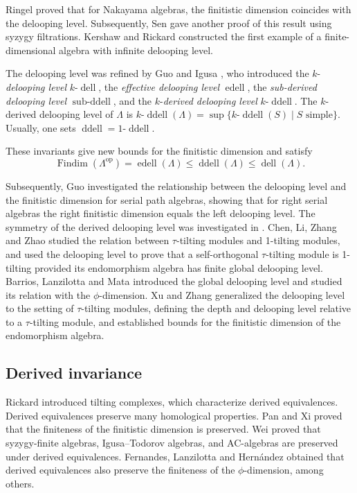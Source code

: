 \documentclass[12pt,a4paper,reqno]{amsart}
\theoremstyle{plain}
\theoremstyle{definition}
\theoremstyle{remark}
\DeclareMathOperator{\op}{op}
\DeclareMathOperator{\Findim}{Findim}
\DeclareMathOperator{\dell}{dell}
\DeclareMathOperator{\subddell}{sub\text{-}ddell}
\DeclareMathOperator{\ddell}{ddell}
\DeclareMathOperator{\edell}{edell}
\begin{document}
Ringel \cite{RingelNakayama} proved that for Nakayama algebras, the finitistic 
dimension coincides with the delooping level. Subsequently, Sen \cite{Sen} gave 
another proof of this result using syzygy filtrations. Kershaw and Rickard \cite{KershawRickard} constructed the first example of a finite-dimensional algebra with infinite delooping level.

The delooping level was refined by Guo and Igusa \cite{GuoIgusa}, who introduced the $k$-\emph{delooping level} $k$-$\dell$, the \emph{effective delooping level} $\edell$, the \emph{sub-derived delooping level} $\subddell$, and the $k$-\emph{derived delooping level} $k$-$\ddell$. The $k$-derived delooping level of $\Lambda$ is $k$-$\ddell(\Lambda) = \sup\{k$-$\ddell(S) \mid S \text{ simple}\}$.
 Usually, one sets $\ddell = 1$-$\ddell$.
 
 These invariants give new bounds for the finitistic dimension and satisfy
\begin{equation}\label{eq:ddell-chain}
\Findim(\Lambda^{\op}) = \edell(\Lambda) \leq \ddell(\Lambda) \leq \dell(\Lambda).
\end{equation}

Subsequently, 
Guo \cite{GuoSerial} investigated the relationship between the delooping level and the finitistic dimension for serial path algebras, showing that for right serial algebras the right finitistic dimension equals the left delooping level.
The symmetry of the derived delooping level was investigated in \cite{SymDDell}.
Chen, Li, Zhang and Zhao \cite{ChenLiZhangZhao} studied the relation between $\tau$-tilting modules and 1-tilting modules, and used the delooping level to prove that a self-orthogonal $\tau$-tilting module is 1-tilting provided its endomorphism algebra has finite global delooping level.
Barrios, Lanzilotta and Mata \cite{BLM} introduced the global delooping level and studied its relation with the $\phi$-dimension.  Xu and Zhang \cite{XuZhang} generalized the delooping level to the setting of $\tau$-tilting modules, defining the depth and delooping level relative to a $\tau$-tilting module, and established bounds for the finitistic dimension of the endomorphism algebra.

\subsection{Derived invariance}

 Rickard \cite{Rickard} introduced tilting complexes, which characterize derived equivalences. Derived equivalences preserve many homological properties. Pan and Xi \cite{PanXi2009} proved that the finiteness 
of the finitistic dimension is preserved.  
Wei \cite{Wei} proved that syzygy-finite algebras, Igusa--Todorov algebras, and AC-algebras are preserved under derived equivalences. Fernandes, Lanzilotta and Hern\'andez \cite{MendozaSaenz} obtained that derived equivalences also preserve the finiteness of the $\phi$-dimension, among others.
\end{document}
